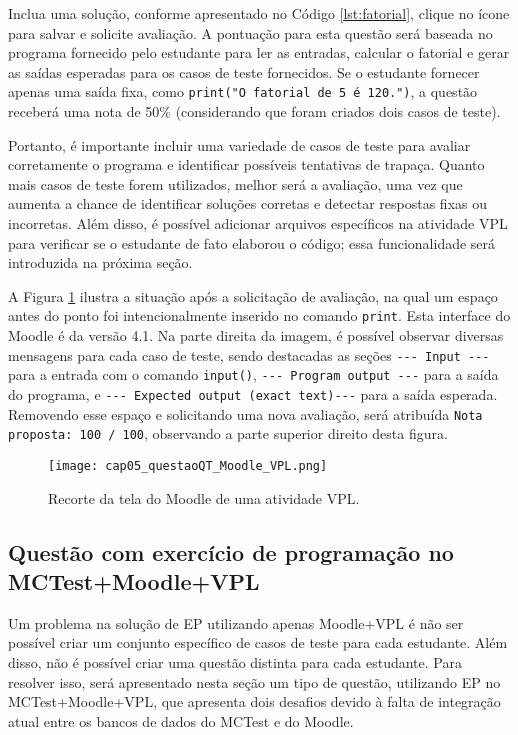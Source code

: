 Inclua uma solução, conforme apresentado no Código \ref{lst:fatorial}, clique no ícone para salvar e solicite avaliação. A pontuação para esta questão será baseada no programa fornecido pelo estudante para ler as entradas, calcular o fatorial e gerar as saídas esperadas para os casos de teste fornecidos. Se o estudante fornecer apenas uma saída fixa, como \verb|print("O fatorial de 5 é 120.")|, a questão receberá uma nota de 50\% (considerando que foram criados dois casos de teste). 

Portanto, é importante incluir uma variedade de casos de teste para avaliar corretamente o programa e identificar possíveis tentativas de trapaça. Quanto mais casos de teste forem utilizados, melhor será a avaliação, uma vez que aumenta a chance de identificar soluções corretas e detectar respostas fixas ou incorretas. Além disso, é possível adicionar arquivos específicos na atividade VPL para verificar se o estudante de fato elaborou o código; essa funcionalidade será introduzida na próxima seção.

A Figura \ref{fig:cap05_questaoQT_Moodle_VPL} ilustra a situação após a solicitação de avaliação, na qual um espaço antes do ponto foi intencionalmente inserido no comando \verb|print|. Esta interface do Moodle é da versão 4.1. Na parte direita da imagem, é possível observar diversas mensagens para cada caso de teste, sendo destacadas as seções \verb|--- Input ---| para a entrada com o comando \verb|input()|, \verb|--- Program output ---| para a saída do programa, e \verb|--- Expected output (exact text)---| para a saída esperada. Removendo esse espaço e solicitando uma nova avaliação, será atribuída \verb|Nota proposta: 100 / 100|, observando a parte superior direito desta figura.


\begin{figure}[!ht]
  \texttt{[image: cap05\_questaoQT\_Moodle\_VPL.png]}
  \caption{Recorte da tela do Moodle de uma atividade VPL.}
  \label{fig:cap05_questaoQT_Moodle_VPL}
\end{figure}


\subsection{Questão com exercício de programação no MCTest+Moodle+VPL}\label{sec:questao_VPL}

Um problema na solução de EP utilizando apenas Moodle+VPL é não ser possível criar um conjunto específico de casos de teste para cada estudante. Além disso, não é possível criar uma questão distinta para cada estudante. Para resolver isso, será apresentado nesta seção um tipo de questão, utilizando EP no MCTest+Moodle+VPL, que apresenta dois desafios devido à falta de integração atual entre os bancos de dados do MCTest e do Moodle.


